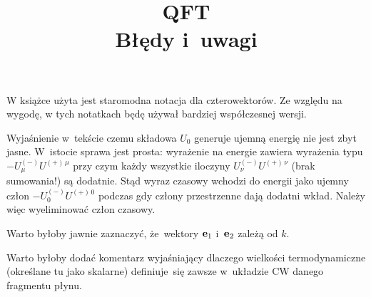 \documentclass[a4paper,11pt]{article}
\title{QFT \\
  Błędy i~uwagi}
\begin{document}





\maketitle %









W książce użyta jest staromodna notacja dla czterowektorów. Ze względu
na wygodę, w tych notatkach będę używał bardziej współczesnej wersji.







 Wyjaśnienie w~tekście czemu składowa $U_{ 0 }$ generuje
ujemną energię nie jest zbyt jasne. W~istocie sprawa jest prosta:
wyrażenie na energie zawiera wyrażenia typu
$-U^{ ( - ) }_{ \mu } U^{ ( + )\, \mu }$ przy czym każdy wszystkie
iloczyny $U^{ ( - ) }_{ \nu } U^{ ( + )\, \nu }$ (brak sumowania!) są
dodatnie. Stąd wyraz czasowy wchodzi do energii jako ujemny człon
$-U^{ ( - ) }_{ 0 } U^{ ( + )\, 0 }$ podczas gdy człony przestrzenne
dają dodatni wkład. Należy więc wyeliminować człon czasowy.

\vspace{\spaceFour}



 Warto byłoby jawnie zaznaczyć, że~wektory $\mathbf{e}_{ 1 }$
i~$\mathbf{e}_{ 2 }$ zależą od $k$.

\vspace{\spaceFour}




\vspace{\spaceFour}



 Warto byłoby dodać komentarz wyjaśniający dlaczego wielkości
termodynamiczne (określane tu jako skalarne) definiuje~się zawsze
w~układzie CW danego fragmentu płynu.
\end{document}
